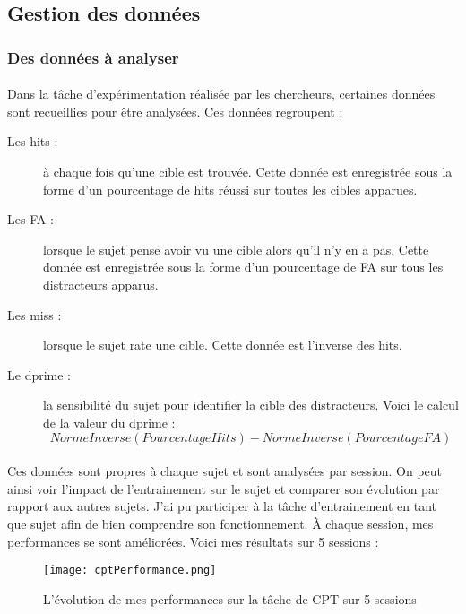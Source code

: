 \subsection{Gestion des données}
\label{Donnees}

\subsubsection{Des données à analyser}

\paragraph{}Dans la tâche d'expérimentation réalisée par les chercheurs, certaines données sont recueillies pour être analysées. Ces données regroupent :
\begin{description}
\item[Les hits :] à chaque fois qu'une cible est trouvée. Cette donnée est enregistrée sous la forme d'un pourcentage de hits réussi sur toutes les cibles apparues.
\item[Les FA :] lorsque le sujet pense avoir vu une cible alors qu'il n'y en a pas. Cette donnée est enregistrée sous la forme d'un pourcentage de FA sur tous les distracteurs apparus.
\item[Les miss :] lorsque le sujet rate une cible. Cette donnée est l'inverse des hits.
\item[Le dprime :] la sensibilité du sujet pour identifier la cible des distracteurs. Voici le calcul de la valeur du dprime : \[NormeInverse(PourcentageHits) - NormeInverse(PourcentageFA)\]
\end{description}

\newpage
\paragraph{}Ces données sont propres à chaque sujet et sont analysées par session. On peut ainsi voir l'impact de l'entrainement sur le sujet et comparer son évolution par rapport
aux autres sujets. J'ai pu participer à la tâche d'entrainement en tant que sujet afin de bien comprendre son fonctionnement. \`{A} chaque session, mes performances se
sont améliorées. Voici mes résultats sur 5 sessions :

\begin{figure}[H]
    \begin{center}
    \texttt{[image: cptPerformance.png]}
    \end{center}
    \caption{L'évolution de mes performances sur la tâche de CPT sur 5 sessions}
\label{CptPerformance}
\end{figure}

